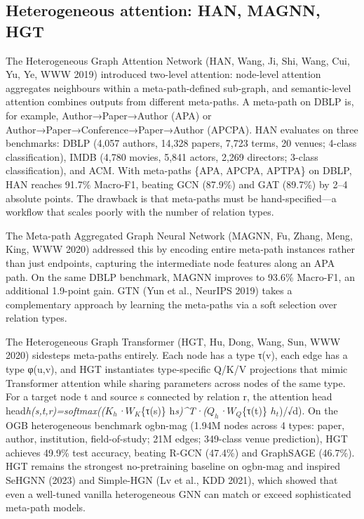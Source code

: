 \subsection{Heterogeneous attention: HAN, MAGNN, HGT}\label{heterogeneous-attention-han-magnn-hgt}

The Heterogeneous Graph Attention Network (HAN, Wang, Ji, Shi, Wang, Cui, Yu, Ye, WWW 2019) introduced two-level attention: node-level attention aggregates neighbours within a meta-path-defined sub-graph, and semantic-level attention combines outputs from different meta-paths. A meta-path on DBLP is, for example, Author→Paper→Author (APA) or Author→Paper→Conference→Paper→Author (APCPA). HAN evaluates on three benchmarks: DBLP (4,057 authors, 14,328 papers, 7,723 terms, 20 venues; 4-class classification), IMDB (4,780 movies, 5,841 actors, 2,269 directors; 3-class classification), and ACM. With meta-paths \{APA, APCPA, APTPA\} on DBLP, HAN reaches 91.7\% Macro-F1, beating GCN (87.9\%) and GAT (89.7\%) by 2--4 absolute points. The drawback is that meta-paths must be hand-specified---a workflow that scales poorly with the number of relation types.

The Meta-path Aggregated Graph Neural Network (MAGNN, Fu, Zhang, Meng, King, WWW 2020) addressed this by encoding entire meta-path instances rather than just endpoints, capturing the intermediate node features along an APA path. On the same DBLP benchmark, MAGNN improves to 93.6\% Macro-F1, an additional 1.9-point gain. GTN (Yun et al., NeurIPS 2019) takes a complementary approach by learning the meta-paths via a soft selection over relation types.

The Heterogeneous Graph Transformer (HGT, Hu, Dong, Wang, Sun, WWW 2020) sidesteps meta-paths entirely. Each node has a type τ(v), each edge has a type φ(u,v), and HGT instantiates type-specific Q/K/V projections that mimic Transformer attention while sharing parameters across nodes of the same type. For a target node t and source s connected by relation r, the attention head head\emph{h(s,t,r)=softmax((\(K_h\)·\(W_K\)}\{τ(s)\} h\emph{s)\^{}T·(\(Q_h\)·\(W_Q\)}\{τ(t)\} \(h_t\))/√d). On the OGB heterogeneous benchmark ogbn-mag (1.94M nodes across 4 types: paper, author, institution, field-of-study; 21M edges; 349-class venue prediction), HGT achieves 49.9\% test accuracy, beating R-GCN (47.4\%) and GraphSAGE (46.7\%). HGT remains the strongest no-pretraining baseline on ogbn-mag and inspired SeHGNN (2023) and Simple-HGN (Lv et al., KDD 2021), which showed that even a well-tuned vanilla heterogeneous GNN can match or exceed sophisticated meta-path models.

